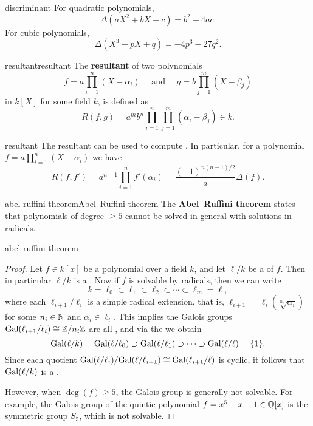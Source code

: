 \begin{example}{discriminant}
    For quadratic polynomials,
    \[ \Delta(aX^2 + bX + c) = b^2 - 4ac . \]
    For cubic polynomials,
    \[ \Delta(X^3 + pX + q) = -4p^3 - 27q^2 . \]
\end{example}

\begin{topic}{resultant}{resultant}
    The \textbf{resultant} of two polynomials
    \[ f = a \prod_{i = 1}^{n} (X - \alpha_i) \quad \text{ and } \quad g = b \prod_{j = 1}^{m} (X - \beta_j) \]
    in $k[X]$ for some field $k$, is defined as
    \[ R(f, g) = a^m b^n \prod_{i = 1}^{n} \prod_{j = 1}^{m} (\alpha_i - \beta_j) \in k . \]
\end{topic}

\begin{example}{resultant}
    The resultant can be used to compute . In particular, for a polynomial $f = a \prod_{i = 1}^{n} (X - \alpha_i)$ we have
    \[ R(f, f') = a^{n - 1} \prod_{i = 1}^{n} f'(\alpha_i) = \frac{(-1)^{n(n - 1)/2}}{a} \Delta(f) . \]
\end{example}

\begin{topic}{abel-ruffini-theorem}{Abel--Ruffini theorem}
    The \textbf{Abel--Ruffini theorem} states that polynomials of degree $\ge 5$ cannot be solved in general with solutions in radicals.
\end{topic}

\begin{example}{abel-ruffini-theorem}
    \begin{proof}
        Let $f \in k[x]$ be a polynomial over a field $k$, and let $\ell/k$ be a  of $f$. Then in particular $\ell/k$ is a . Now if $f$ is solvable by radicals, then we can write
        \[ k = \ell_0 \subset \ell_1 \subset \ell_2 \subset \cdots \subset \ell_m = \ell , \]
        where each $\ell_{i + 1}/\ell_i$ is a simple radical extension, that is, $\ell_{i + 1} = \ell_i(\sqrt[n_i]{\alpha_i})$ for some $n_i \in \mathbb{N}$ and $\alpha_i \in \ell_i$. This implies the Galois groups $\textup{Gal}(\ell_{i + 1}/\ell_i) \cong \mathbb{Z}/n_i\mathbb{Z}$ are all , and via the  we obtain
        \[ \textup{Gal}(\ell/k) = \textup{Gal}(\ell/\ell_0) \supset \textup{Gal}(\ell/\ell_1) \supset \cdots \supset \textup{Gal}(\ell/\ell) = \{ 1 \} . \]
        Since each quotient $\textup{Gal}(\ell/\ell_i) / \textup{Gal}(\ell/\ell_{i + 1}) \cong \textup{Gal}(\ell_{i + 1}/\ell)$ is cyclic, it follows that $\textup{Gal}(\ell/k)$ is a .
        
        However, when $\deg(f) \ge 5$, the Galois group is generally not solvable. For example, the Galois group of the quintic polynomial $f = x^5 - x - 1 \in \mathbb{Q}[x]$ is the symmetric group $S_5$, which is not solvable.
    \end{proof}
\end{example}

